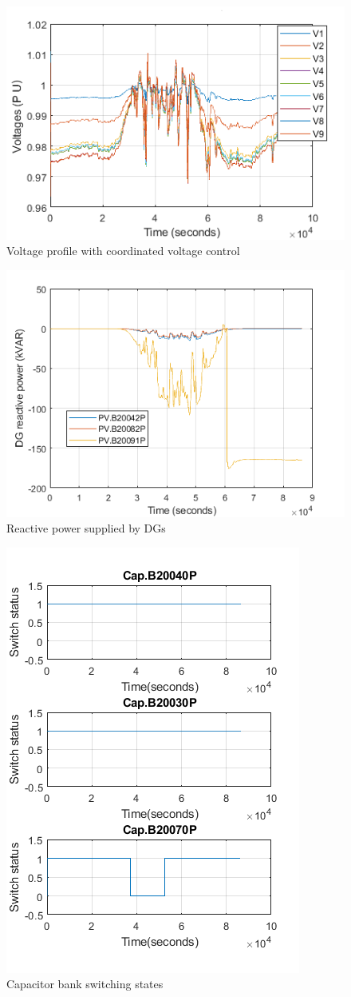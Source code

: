 \begin{figure}[!h]
\centering
\includegraphics[width=0.5\linewidth]{figs/CVC/With_VVC.png}
\caption{Voltage profile with coordinated voltage control}
\label{fig:with_cvc}
\end{figure}

\begin{figure}[!h]
\centering
\includegraphics[width=0.5\linewidth]{figs/CVC/DG_Q.png}
\caption{Reactive power supplied by DGs}
\label{fig:DG_Q}
\end{figure}

\begin{figure}[!h]
\centering
\includegraphics[width=0.5\linewidth]{figs/CVC/CAP_BANK.png}
\caption{Capacitor bank switching states}
\label{fig:cap_bank}
\end{figure}
